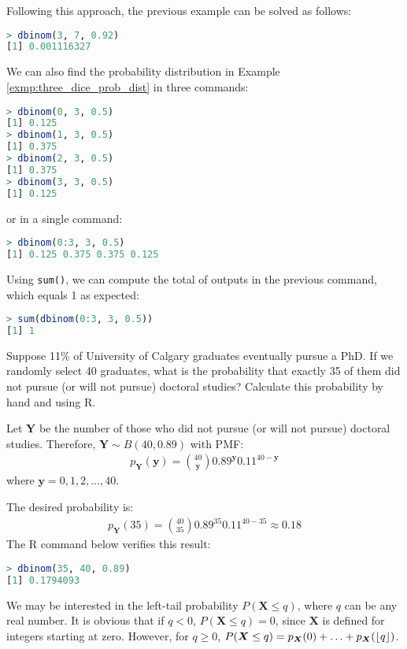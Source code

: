 Following this approach, the previous example can be solved as follows:
\begin{lstlisting}[language=R]
> dbinom(3, 7, 0.92)
[1] 0.001116327
\end{lstlisting}
We can also find the probability distribution in Example \autoref{exmp:three_dice_prob_dist} in three commands:
\begin{lstlisting}[language=R]
> dbinom(0, 3, 0.5)
[1] 0.125
> dbinom(1, 3, 0.5)
[1] 0.375
> dbinom(2, 3, 0.5)
[1] 0.375
> dbinom(3, 3, 0.5)
[1] 0.125
\end{lstlisting}
or in a single command:
\begin{lstlisting}[language=R]
> dbinom(0:3, 3, 0.5)
[1] 0.125 0.375 0.375 0.125
\end{lstlisting}
Using \verb|sum()|, we can compute the total of outputs in the previous command, which equals 1 as expected:
\begin{lstlisting}[language=R]
> sum(dbinom(0:3, 3, 0.5))
[1] 1
\end{lstlisting}
\begin{exmp}\label{exmp:ucalgary}
    Suppose 11\% of University of Calgary graduates eventually pursue a PhD.
    If we randomly select 40 graduates,
    what is the probability that exactly 35 of them did not pursue (or will not pursue) doctoral studies?
    Calculate this probability by hand and using R.
\end{exmp}
\begin{solution}
    Let \( \bm{Y} \) be the number of those who did not pursue (or will not pursue) doctoral studies.
    Therefore, \( \bm{Y} \sim B(40, 0.89) \) with PMF:
    \begin{gather*}
        p_{\bm{Y}}(\bm{y}) = \binom{40}{\bm{y}} 0.89^{\bm{y}}0.11^{40 - \bm{y}}
    \end{gather*}
    where \( \bm{y} = 0, 1, 2, \ldots, 40 \).

    The desired probability is:
    \begin{gather*}
        p_{\bm{Y}}(35) = \binom{40}{35} 0.89^{35}0.11^{40 - 35} \approx 0.18
    \end{gather*}
    The R command below verifies this result:
    \begin{lstlisting}[language=R]
> dbinom(35, 40, 0.89)
[1] 0.1794093
    \end{lstlisting}
\end{solution}
We may be interested in the left-tail probability \( P(\bm{X} \leq q) \), where \( q \) can be any real number.
It is obvious that if \( q < 0 \), \( P(\bm{X} \leq q) = 0 \), since \( \bm{X} \) is defined for integers starting at zero.
However, for \( q \geq 0\), \( P(\bm{X} \leq q) = p_{\bm{X}}(0) + \ldots + p_{\bm{X}}(\lfloor q\rfloor) \).

